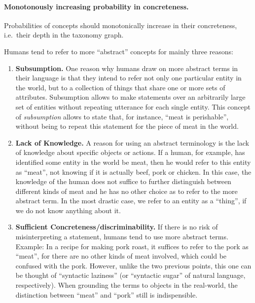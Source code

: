 \documentclass[12pt,a4paper]{article}
\begin{document}
\paragraph{Monotonously increasing probability in concreteness.} 
Probabilities of concepts should monotonically increase in their 
concreteness, i.e.\ their depth in the taxonomy graph.
 
Humans tend to refer to more ``abstract'' concepts for mainly three 
reasons: 

\begin{enumerate}
	\item \textbf{Subsumption.} One reason why humans draw on more 
	abstract terms in their language is that they intend to refer 
	not only one particular entity in the world, but to a collection 
	of things that share one or more sets of attributes. Subsumption 
	allows to make statements over an arbitrarily large set of 
	entities without repeating utterance for each single entity. 
	This concept of \emph{subsumption} allows to state that, for 
	instance, ``meat is perishable'', without being to repeat this 
	statement for the piece of meat in the world.
	
	\item \textbf{Lack of Knowledge.} A reason for using an abstract 
	terminology is the lack of knowledge about specific objects or 
	actions. If a human, for example, has identified some entity in 
	the world be meat, then he would refer to this entity as 
	``meat'', not knowing if it is actually beef, pork or chicken. 
	In this case, the knowledge of the human does not suffice to 
	further distinguish between different kinds of meat and he has 
	no other choice as to refer to the more abstract term. In the 
	most drastic case, we refer to an entity as a ``thing'', if we 
	do not know anything about it. 
	
	\item \textbf{Sufficient Concreteness/discriminability.} If 
	there is no risk of misinterpreting a statement, humans tend to 
	use more abstract terms. Example: In a recipe for making pork 
	roast, it suffices to refer to the pork as ``meat'', for there 
	are no other kinds of meat involved, which could be confused 
	with the pork. However, unlike the two previous points, this one 
	can be thought of ``syntactic laziness'' (or ``syntactic sugar'' 
	of natural language, respectively). When grounding the terms
	to objects in the real-world, the distinction between ``meat''
	and ``pork'' still is indispensible.
	
\end{enumerate}
\end{document}
